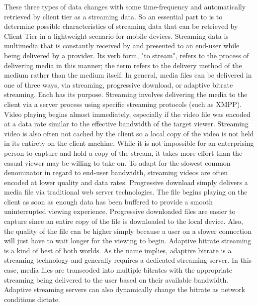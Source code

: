    These three types of data changes with some time-frequency and automatically retrieved by client tier as a streaming data. So an essential part to is to determine possible characteristics of streaming data that can be retrieved by Client Tier in a lightweight scenario for mobile devices.
   \newline
    Streaming data is multimedia that is constantly received by and presented to an end-user while being delivered by a provider. Its verb form, "to stream", refers to the process of delivering media in this manner; the term refers to the delivery method of the medium rather than the medium itself. In general, media files can be delivered in one of three ways, via streaming, progressive download, or adaptive bitrate streaming.  Each has its purpose.
  \newline
    Streaming involves delivering the media to the client via a server process using specific streaming protocols (such as XMPP).  Video playing begins almost immediately, especially if the video file was encoded at a data rate similar to the effective bandwidth of the target viewer.  Streaming video is also often not cached by the client so a local copy of the video is not held in its entirety on the client machine.  While it is not impossible for an enterprising person to capture and hold a copy of the stream, it takes more effort than the casual viewer may be willing to take on.  To adapt for the slowest common denominator in regard to end-user bandwidth, streaming videos are often encoded at lower quality and data rates.
  \newline
    Progressive download simply delivers a media file via traditional web server technologies.  The file begins playing on the client as soon as enough data has been buffered to provide a smooth uninterrupted viewing experience.  Progressive downloaded files are easier to capture since an entire copy of the file is downloaded to the local device.  Also, the quality of the file can be higher simply because a user on a slower connection will just have to wait longer for the viewing to begin.
  \newline
    Adaptive bitrate streaming is a kind of best of both worlds.  As the name implies, adaptive bitrate is a streaming technology and generally requires a dedicated streaming server.  In this case, media files are transcoded into multiple bitrates with the appropriate streaming being delivered to the user based on their available bandwidth.  Adaptive streaming servers can also dynamically change the bitrate as network conditions dictate\cite{ilias2013study}.
